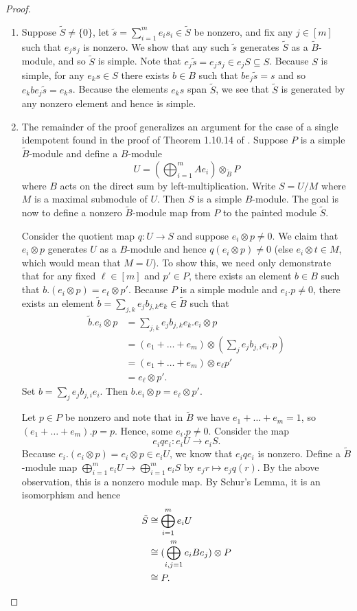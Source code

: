 \documentclass[ALCO,Unicode,published]{cedram}
\newcommand{\tB}{{\tilde{B}}}
\newcommand{\tS}{{\tilde{S}}}
\begin{document}
\begin{proof} \phantom{a}
    \begin{enumerate}
        \item Suppose $\tS\neq\{0\}$, let $\tilde{s}=\sum_{i=1}^m e_is_i\in\tS$ be nonzero, and fix any $j\in[m]$ such that $e_js_j$ is nonzero. We show that any such $\tilde{s}$ generates $\tS$ as a $\tB$-module, and so $\tS$ is simple. Note that $e_j\tilde{s}=e_js_j\in e_j S\subseteq S$. Because $S$ is simple, for any $e_ks\in S$ there exists $b\in B$ such that $be_j\tilde{s}=s$ and so $e_kb e_j\tilde{s}=e_k s$. Because the elements $e_k s$ span $\tS$, we see that $\tS$ is generated by any nonzero element and hence is simple.

        \item The remainder of the proof generalizes an argument for the case of a single idempotent found in the proof of Theorem 1.10.14 of \cite{linckelmann_2018}. Suppose $P$ is a simple $\tB$-module and define a $B$-module \[U=\left(\bigoplus_{i=1}^m Ae_i\right)\otimes_{\tB}P\] where $B$ acts on the direct sum by left-multiplication. Write $S=U/M$ where $M$ is a maximal submodule of $U$. Then $S$ is a simple $B$-module. The goal is now to define a nonzero $\tB$-module map from $P$ to the painted module $\tS$.

    Consider the quotient map $q:U\to S$ and suppose $e_i\otimes p\neq0$. We claim that $e_i\otimes p$ generates $U$ as a $B$-module and hence $q(e_i\otimes p)\neq0$ (else $e_i\otimes t\in M$, which would mean that $M=U$). To show this, we need only demonstrate that for any fixed $\ell\in[m]$ and $p'\in P$, there exists an element $b\in B$ such that $b.(e_i\otimes p)=e_\ell\otimes p'$. Because $P$ is a simple module and $e_i.p\neq0$, there exists an element  $\tilde{b}=\sum_{j,k}e_jb_{j,k}e_k\in \tB$ such that \begin{align*}
        \tilde{b}.e_i\otimes p&=\sum_{j,k}e_jb_{j,k}e_k.e_i\otimes p\\
        &=(e_1+\dots+e_m)\otimes (\sum_{j}e_jb_{j,i}e_i.p)\\
        &=(e_1+\dots+e_m)\otimes e_\ell p'\\
        &=e_\ell\otimes p'.
    \end{align*} Set $b=\sum_{j}e_jb_{j,i}e_i$. Then $b.e_i\otimes p=e_\ell\otimes p'$.

    Let $p\in P$ be nonzero and note that in $\tB$ we have $e_1+\dots+e_m=1$, so $(e_1+\dots+e_m).p=p$. Hence, some $e_i.p\neq0$. Consider the map \[e_i q e_i:e_iU\to e_i S.\] Because $e_i.(e_i\otimes p)=e_i\otimes p \in e_i U$, we know that $e_i q e_i$ is nonzero.  Define a $\tB$-module map $\bigoplus_{i=1}^m e_iU\to\bigoplus_{i=1}^m e_iS$ by $e_jr\mapsto e_j q(r)$. By the above observation, this is a nonzero module map. By Schur's Lemma, it is an isomorphism and hence \begin{align*}
        \tS&\cong \bigoplus_{i=1}^m e_iU\\
        &\cong(\bigoplus_{i,j=1}^m e_iBe_j)\otimes P\\
        &\cong P. \qedhere
    \end{align*}
    \end{enumerate}
\end{proof}
\end{document}
